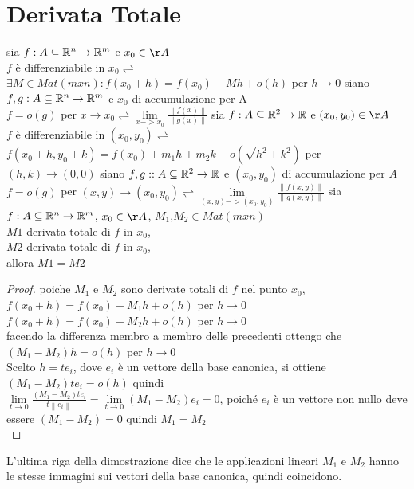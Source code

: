 \section{Derivata Totale}
sia $f:A\subseteq \mathbb{R}^n\rightarrow \mathbb{R}^m$ e $x_0\in\AA$ \\
$f$ è differenziabile in $x_0\rightleftharpoons$ $\exists M\in Mat(mxn) : f(x_0+h) = f(x_0)+Mh+o(h)$ per $h\rightarrow 0$ 
siano $f,g : A\subseteq \mathbb{R}^n\rightarrow \mathbb{R}^m$ e $x_0$ di accumulazione per A \\
$f=o(g)$ per $x\rightarrow x_0 \rightleftharpoons \lim\limits_{x->x_0}\frac{\left\| f(x)\right\| }{\left\| g(x)\right\| }$
sia $f:A\subseteq \mathbb{R}^2\rightarrow \mathbb{R}$ e $(x_0,y_0)\in\AA$ \\
$f$ è differenziabile in $(x_0,y_0)\rightleftharpoons$ $f(x_0+h,y_0+k) = f(x_0)+m_1h+m_2k+o(\sqrt{h^2+k^2})$ per $(h,k)\rightarrow (0,0)$
siano $f,g : :A\subseteq \mathbb{R}^2\rightarrow \mathbb{R}$ e $(x_0,y_0)$ di accumulazione per $A$ \\
$f=o(g)$ per $(x,y)\rightarrow (x_0,y_0) \rightleftharpoons \lim\limits_{(x,y)->(x_0,y_0)}\frac{\left\| f(x,y)\right\| }{\left\| g(x,y)\right\| }$
sia $f:A\subseteq \mathbb{R}^n\rightarrow \mathbb{R}^m$, $x_0\in\AA$, $M_1$,$M_2\in Mat(mxn)$\\
$M1$ derivata totale di $f$ in $x_0$,\\
$M2$ derivata totale di $f$ in $x_0$,\\
allora $M1=M2$\\
\begin{proof}
	poiche $M_1$ e $M_2$ sono derivate totali di $f$ nel punto $x_0$,\\
	$f(x_0+h) = f(x_0)+M_1h+o(h)$ per $h\rightarrow 0$\\
	$f(x_0+h) = f(x_0)+M_2h+o(h)$ per $h\rightarrow 0$\\
	facendo la differenza membro a membro delle precedenti ottengo che $(M_1-M_2)h=o(h)$ per $h\rightarrow 0$\\
	Scelto $h=te_i$, dove $e_i$ è un vettore della base canonica, si ottiene $(M_1-M_2)te_i=o(h)$ quindi\\
	$\lim\limits_{t\rightarrow 0}\frac{(M_1-M_2)te_i}{t\left\| e_i\right\| } = \lim\limits_{t\rightarrow 0}(M_1-M_2)e_i = 0$, poiché $e_i$ è un vettore non nullo deve essere $(M_1-M_2)=0$ quindi $M_1 = M_2$\\
\end{proof}
\observation
L'ultima riga della dimostrazione dice che le applicazioni lineari $M_1$ e $M_2$ hanno le stesse immagini sui vettori della base canonica, quindi coincidono.

